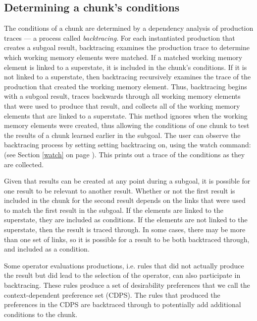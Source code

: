 \subsection{Determining a chunk's conditions}

The conditions of a chunk are determined by a dependency analysis of
production traces --- a process called \emph{backtracing}.  For each
instantiated production that creates a subgoal result, backtracing examines
the production trace to determine which working memory elements were matched.
If a matched working memory element is linked to a superstate, it is included
in the chunk's conditions. If it is not linked to a superstate, then
backtracing recursively examines the trace of the production that created the
working memory element. Thus, backtracing begins with a subgoal result, traces
backwards through all working memory elements that were used to produce that
result, and collects all of the working memory elements that are linked to a
superstate. This method ignores when the working memory elements were created,
thus allowing the conditions of one chunk to test the results of a chunk
learned earlier in the subgoal. The user can observe the backtracing process
by setting setting backtracing on, using the watch command:  (see Section \ref{watch} on page \pageref{watch}). 
This prints out a trace of the conditions as they are collected.

Given that results can be created at any point during a subgoal, it is
possible for one result to be relevant to another result. Whether or not the 
first result is included in the chunk for the second result depends on the
links that were used to match the first result in the subgoal. If the elements
are linked to the superstate, they are included as conditions. If the
elements are not linked to the superstate, then the result is traced through.
In some cases, there may be more than one set of links, so it is possible for
a result to be both backtraced through, and included as a condition.

Some operator evaluations productions, i.e. rules that did not actually produce
the result but did lead to the selection of the operator, can also participate
in backtracing.  These rules produce a set of desirability preferences that we
call the context-dependent preference set (CDPS).  The rules that produced the
preferences in the CDPS are backtraced through to potentially add additional
conditions to the chunk.


